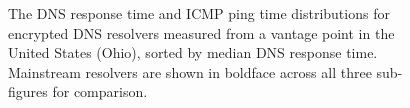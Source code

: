 \begin{figure}[t!]
\hspace*{-1in}
\begin{minipage}{1.35\textwidth}
\hfill%
%
\hfill%
%
    \caption{The DNS response time and ICMP ping time distributions for
    encrypted DNS resolvers measured from a vantage point in the United States
    (Ohio), sorted by median DNS response time. Mainstream resolvers are shown in boldface across all three
    sub-figures for comparison.}
\label{fig:dns-us}
\end{minipage}
\end{figure}

